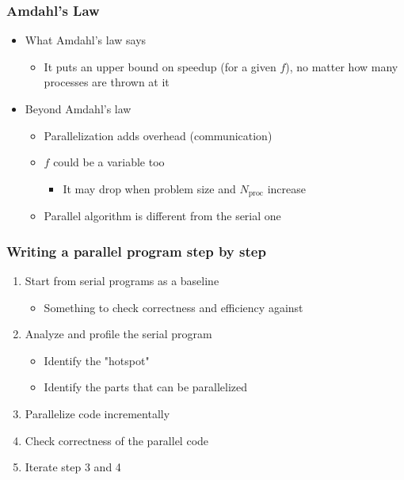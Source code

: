 \documentclass[10pt,t]{beamer}
\begin{document}
\begin{frame}
  \frametitle{Amdahl's Law}
  \begin{itemize}
  \item What Amdahl's law says
    \begin{itemize}
    \item It puts an upper bound on speedup (for a given $f$), no matter how many processes are thrown at it
    \end{itemize}
  \item Beyond Amdahl's law
    \begin{itemize}
    \item Parallelization adds overhead (communication)
    \item $f$ could be a variable too
      \begin{itemize}
      \item It may drop when problem size and $N_\mathrm{proc}$ increase
      \end{itemize}
    \item Parallel algorithm is different from the serial one
    \end{itemize}
  \end{itemize}
\end{frame}

\begin{frame}
  \frametitle{Writing a parallel program step by step}
  \begin{enumerate}
  \item Start from serial programs as a baseline
    \begin{itemize}
    \item Something to check correctness and efficiency against
    \end{itemize}
  \item Analyze and profile the serial program
    \begin{itemize}
    \item Identify the "hotspot"
    \item Identify the parts that can be parallelized
    \end{itemize}
  \item Parallelize code incrementally
  \item Check correctness of the parallel code
  \item Iterate step 3 and 4
  \end{enumerate}
\end{frame}
\end{document}

